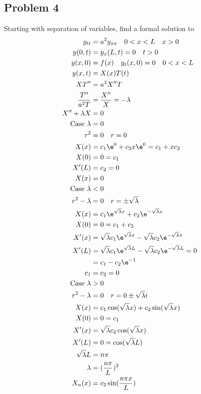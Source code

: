 \documentclass{math}
\begin{document}
\subsection*{Problem 4}
Starting with separation of variables, find a formal solution to
\begin{align*}
  y_{tt} &= a^2y_{xx} \quad 0<x<L \quad x>0 \\
  y(0,t) &= y_x(L,t) = 0 \quad t>0 \\
  y(x,0) &= f(x) \quad y_t(x,0) = 0 \quad 0<x<L \\
  y(x,t) &= X(x)T(t) \\
  XT'' &= a^2X''T \\
  \frac{T''}{a^2T} &= \frac{X''}{X} = -\lambda \\
  X''+\lambda X &= 0 \\
  \text{Case } \lambda &= 0 \\
  r^2 &= 0 \quad r = 0 \\
  X(x) &= c_1\e^0+c_2x\e^0 = c_1+xc_2 \\
  X(0) &= 0 = c_1 \\
  X'(L) &= c_2 = 0 \\
  X(x) &= 0 \\
  \text{Case } \lambda &< 0 \\
  r^2-\lambda &= 0 \quad r = \pm\sqrt{\lambda} \\
  X(x) &= c_1\e^{\sqrt{\lambda}x}+c_2\e^{-\sqrt{\lambda}x} \\
  X(0) &= 0 = c_1+c_2 \\
  X'(x) &= \sqrt{\lambda}c_1\e^{\sqrt{\lambda}x}-
    \sqrt{\lambda}c_2\e^{-\sqrt{\lambda}x} \\
  X'(L) &= \sqrt{\lambda}c_1\e^{\sqrt{\lambda}L}-
    \sqrt{\lambda}c_2\e^{-\sqrt{\lambda}L} = 0 \\
  &= c_1-c_2\e^{-1} \\
  c_1 &= c_2 = 0 \\
  \text{Case } \lambda &> 0 \\
  r^2-\lambda &= 0 \quad r = 0\pm\sqrt{\lambda}i \\
  X(x) &= c_1\cos(\sqrt{\lambda}x)+c_2\sin(\sqrt{\lambda}x) \\
  X(0) &= 0 = c_1 \\
  X'(x) &= \sqrt{\lambda}c_2\cos(\sqrt{\lambda}x) \\
  X'(L) &= 0 = \cos(\sqrt{\lambda}L) \\
  \sqrt{\lambda}L &= n\pi \\
  \lambda &= (\frac{n\pi}{L})^2 \\
  X_n(x) &= c_2\sin(\frac{n\pi x}{L}) \\
\end{align*}
\end{document}
